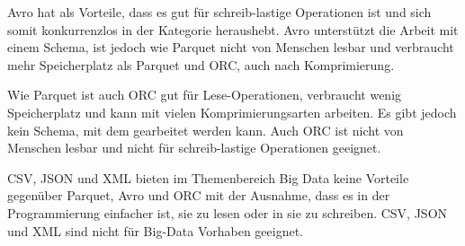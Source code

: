 Avro hat als Vorteile, dass es gut für schreib-lastige Operationen ist und sich somit konkurrenzlos in der Kategorie heraushebt. Avro unterstützt die Arbeit mit einem Schema, ist jedoch wie Parquet nicht von Menschen lesbar und verbraucht mehr Speicherplatz als Parquet und ORC, auch nach Komprimierung.

Wie Parquet ist auch ORC gut für Lese-Operationen, verbraucht wenig Speicherplatz und kann mit vielen Komprimierungsarten arbeiten. Es gibt jedoch kein Schema, mit dem gearbeitet werden kann. Auch ORC ist nicht von Menschen lesbar und nicht für schreib-lastige Operationen geeignet.

CSV, JSON und XML bieten im Themenbereich Big Data keine Vorteile gegenüber Parquet, Avro und ORC mit der Ausnahme, dass es in der Programmierung einfacher ist, sie zu lesen oder in sie zu schreiben. CSV, JSON und XML sind nicht für Big-Data Vorhaben geeignet.